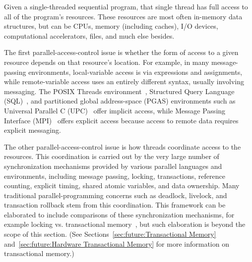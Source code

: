 Given a single-threaded sequential program, that single
thread has full access to all of the program's resources.
These resources are most often in-memory data structures, but can be CPUs,
memory (including caches), I/O devices, computational accelerators, files,
and much else besides.

The first parallel-access-control issue is whether the form of access to
a given resource depends on that resource's location.
For example, in many message-passing environments, local-variable
access is via expressions and assignments,
while remote-variable access uses an entirely different
syntax, usually involving messaging.
The POSIX Threads environment~\cite{OpenGroup1997pthreads},
Structured Query Language (SQL)~\cite{DIS9075SQL92}, and
partitioned global address-space (PGAS) environments
such as Universal Parallel C (UPC)~\cite{ElGhazawi2003UPC}
offer implicit access,
while Message Passing Interface (MPI)~\cite{MPIForum2008} offers
explicit access because access to remote data requires explicit
messaging.

The other parallel-access-control issue is how threads coordinate
access to the resources.
This coordination is carried out by
the very large number of synchronization mechanisms
provided by various parallel languages and environments,
including message passing, locking, transactions,
reference counting, explicit timing, shared atomic variables, and data
ownership.
Many traditional parallel-programming concerns such as deadlock,
livelock, and transaction rollback stem from this coordination.
This framework can be elaborated to include comparisons
of these synchronization mechanisms, for example locking vs. transactional
memory~\cite{McKenney2007PLOSTM}, but such elaboration is beyond the
scope of this section.
(See
Sections~\ref{sec:future:Transactional Memory}
and~\ref{sec:future:Hardware Transactional Memory}
for more information on transactional memory.)

\QuickQuizEnd

